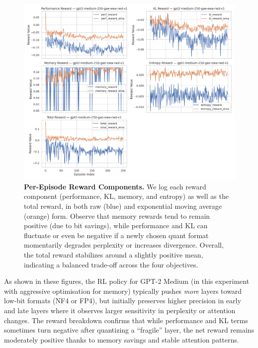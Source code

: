 \documentclass{article}
\begin{document}
	\begin{figure}[ht]
		
		\centering
		\includegraphics[width=1.0\columnwidth]{gpt2-medium-250-gae-ewa-rwd-v1_reward_subplots.png}
		\vspace{-1em}
		\caption{\small
			\textbf{Per-Episode Reward Components.}
			We log each reward component (performance, KL, memory, and entropy) as well as the total reward, in both raw (blue) and exponential moving average (orange) form. 
			Observe that memory rewards tend to remain positive (due to bit savings), while performance and KL can fluctuate or even be negative if a newly chosen quant format momentarily degrades perplexity or increases divergence. 
			Overall, the total reward stabilizes around a slightly positive mean, indicating a balanced trade-off across the four objectives.
		}
		\label{fig:gpt2medium-rewards}
	\end{figure}
	
	\vspace{1em}
	\noindent
	As shown in these figures, the RL policy for GPT-2 Medium (in this experiment with aggressive optimisation for memory) typically pushes \emph{more} layers toward low-bit formats (NF4 or FP4), but initially preserves higher precision in early and late layers where it observes larger sensitivity in perplexity or attention changes. 
	The reward breakdown confirms that while performance and KL terms sometimes turn negative after quantizing a “fragile” layer, the net reward remains moderately positive thanks to memory savings and stable attention patterns.
				
				
	
\end{document}
